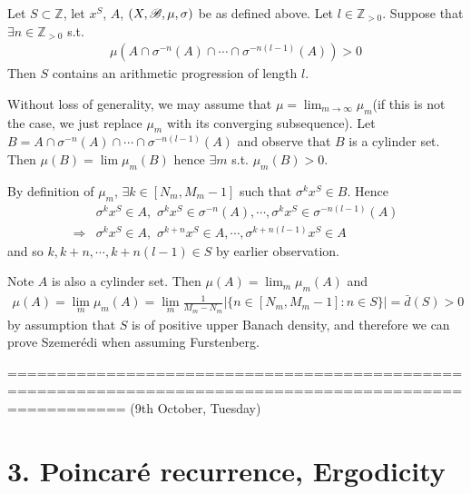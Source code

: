 \documentclass[10pt,a4paper]{report}
\newenvironment{proof}
{\begin{changemargin}{1cm}{0.5cm} 
	}%
	{\end{changemargin}
}
\begin{document}
\prop Let $S\subset\mathbb{Z}$, let $x^S$, $A$, $(X,\mathscr{B}, \mu, \sigma)$ be as defined above. Let $l\in \mathbb{Z}_{>0}$. Suppose that $\exists n \in \mathbb{Z}_{>0}$ s.t.
\begin{align*}
\mu ( A \cap \sigma^{-n}(A) \cap \cdots \cap \sigma^{-n(l-1)}(A) ) >0
\end{align*}
Then $S$ contains an arithmetic progression of length $l$.

\begin{proof}
\pf Without loss of generality, we may assume that $\mu = \lim_{m\rightarrow \infty} \mu_m$(if this is not the case, we just replace $\mu_m$ with its converging subsequence).  Let $B = A \cap \sigma^{-n}(A) \cap \cdots \cap \sigma^{-n(l-1)}(A)$ and observe that $B$ is a cylinder set. Then $\mu(B) = \lim \mu_m(B)$ hence $\exists m$ s.t. $\mu_m (B) >0$.

By definition of $\mu_m$, $\exists k \in [N_m,M_m-1]$ such that $\sigma^k x^S \in B$. Hence
\begin{align*}
&\sigma^k x^S \in A, \,\, \sigma^kx^S \in \sigma^{-n}(A),\cdots,\sigma^k x^S \in \sigma^{-n(l-1)}(A) \\
\Rightarrow &\sigma^k x^S \in A, \,\, \sigma^{k+n}x^S \in A, \cdots,\sigma^{k+n(l-1)} x^S \in A
\end{align*}
and so $k,k+n,\cdots,k+n(l-1) \in S$ by earlier observation.

\eop
\end{proof}
\s

Note $A$ is also a cylinder set. Then $\mu(A)= \lim_{m} \mu_m (A)$ and
\begin{align*}
\mu(A) = \lim_m \mu_m(A) = \lim_m \frac{1}{M_m -N_m} \big| \{ n\in [N_m, M_m-1] : n\in S \} \big| = \bar{d}(S) > 0
\end{align*}
by assumption that $S$ is of positive upper Banach density, and therefore we can prove Szemer\'{e}di when assuming Furstenberg.
\s

========================================================================================================
(9th October, Tuesday)
\s

\section*{3. Poincar\'{e} recurrence, Ergodicity}
\end{document}
